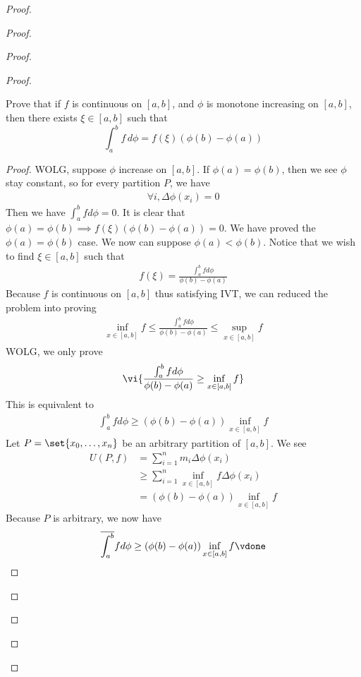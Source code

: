 \documentclass{report}
\begin{document}
\begin{proof}
\begin{proof}
\begin{proof}
\begin{proof}
\begin{question}{}{}
Prove that if \( f \) is continuous on \( [a, b] \), and \( \phi \) is monotone increasing on \( [a, b] \), then there exists \( \xi \in [a, b] \) such that
\[ \int_{a}^{b} f \, d\phi = f(\xi)(\phi(b) - \phi(a)) \]
\end{question}
\begin{proof}
WOLG, suppose $\phi$ increase on $[a,b]$. If $\phi(a)=\phi (b)$, then we see $\phi$ stay constant, so for every partition $P$, we have 
\begin{align*}
\forall i, \Delta \phi(x_i)=0
\end{align*}
Then we have $\int_a^bfd\phi=0$. It is clear that $\phi(a)=\phi(b)\implies f(\xi)(\phi(b)-\phi(a))=0$. We have proved the $\phi(a)=\phi(b)$ case. We now can suppose $\phi(a)<\phi(b)$. Notice that we wish to find $\xi \in [a,b]$ such that 
\begin{align*}
f(\xi)=\frac{\int_a^b fd\phi}{\phi(b)-\phi(a)}
\end{align*}
Because $f$ is continuous on $[a,b]$ thus satisfying IVT, we can reduced the problem into proving 
\begin{align*}
\inf_{x\in [a,b]}f\leq \frac{\int_a^b fd\phi}{\phi (b)-\phi (a)} \leq \sup_{x\in [a,b]} f
\end{align*}
WOLG, we only prove 
\begin{align*}
  \vi{\frac{\int_a^b fd\phi}{\phi(b)-\phi(a)}\geq \inf_{x\in [a,b]}f}
\end{align*}
This is equivalent to 
\begin{align*}
\int_a^b fd\phi \geq  (\phi(b)-\phi (a)) \inf_{x\in [a,b]}f
\end{align*}
Let $P=\set{x_0,\dots ,x_n}$ be an arbitrary partition of  $[a,b]$. We see 
\begin{align*}
U(P,f)&=\sum_{i=1}^n  m_i\Delta \phi(x_i)\\
&\geq  \sum_{i=1}^n \inf_{x\in [a,b]}f \Delta \phi (x_i)\\
&=(\phi (b)-\phi (a))\inf_{x\in [a,b]} f 
\end{align*}
Because $P$ is arbitrary, we now have 
 \begin{align*}
\overline{\int_a^b}fd\phi \geq (\phi(b)-\phi(a))\inf_{x\in [a,b]}f\vdone
\end{align*}




\end{proof}
\end{proof}
\end{proof}
\end{proof}
\end{proof}
\end{document}
